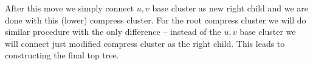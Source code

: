 After this move we simply connect $u,v$ base cluster as new right child and we
are done with this (lower) compress cluster. For the root compress cluster we
will do similar procedure with the only difference -- instead of the $u,v$ base
cluster we will connect just modified compress cluster as the right child. This
leads to constructing the final top tree.
